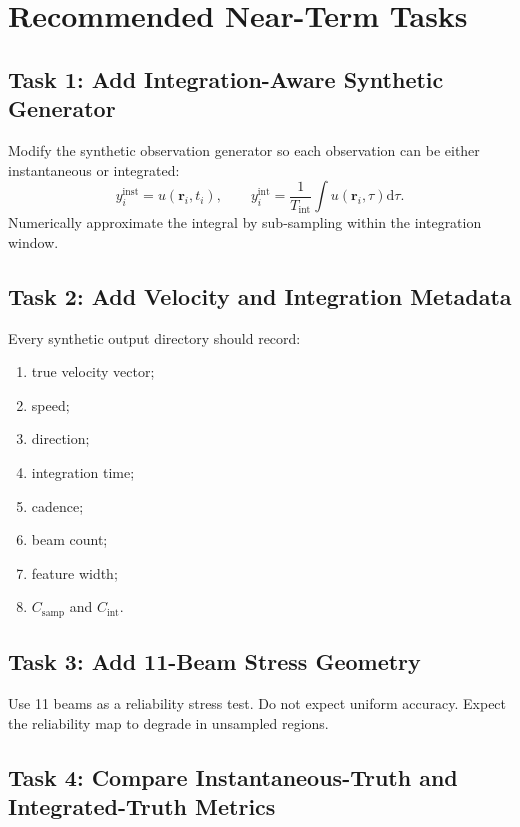 \documentclass[11pt]{article}
\newcommand{\dd}{\mathrm{d}}
\begin{document}
\section{Recommended Near-Term Tasks}

\subsection{Task 1: Add Integration-Aware Synthetic Generator}

Modify the synthetic observation generator so each observation can be either instantaneous or
integrated:
\begin{equation}
  y_i^{\mathrm{inst}} = u(\mathbf{r}_i,t_i),
  \qquad
  y_i^{\mathrm{int}} =
  \frac{1}{T_{\mathrm{int}}}\int u(\mathbf{r}_i,\tau)\dd\tau.
\end{equation}
Numerically approximate the integral by sub-sampling within the integration window.

\subsection{Task 2: Add Velocity and Integration Metadata}

Every synthetic output directory should record:
\begin{enumerate}[leftmargin=*]
  \item true velocity vector;
  \item speed;
  \item direction;
  \item integration time;
  \item cadence;
  \item beam count;
  \item feature width;
  \item $C_{\mathrm{samp}}$ and $C_{\mathrm{int}}$.
\end{enumerate}

\subsection{Task 3: Add 11-Beam Stress Geometry}

Use 11 beams as a reliability stress test. Do not expect uniform accuracy. Expect the reliability
map to degrade in unsampled regions.

\subsection{Task 4: Compare Instantaneous-Truth and Integrated-Truth Metrics}
\end{document}
